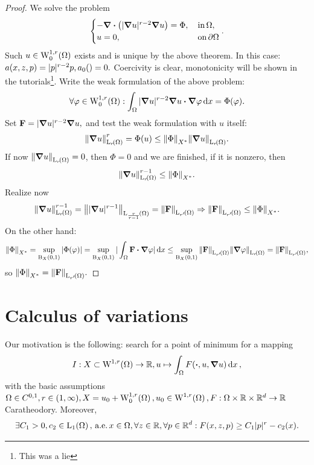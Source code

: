 \documentclass{article}
\begin{document}
\begin{proof}
	We solve the problem
	\begin{equation}
		\begin{cases}
			- \divergence{\qty(|\grad u|^{r-2}\grad u)} = \Phi, & \, \text{in} \, \Omega, \\
			u = 0, & \, \text{on} \, \partial \Omega
		\end{cases}.
	\end{equation}
	Such $u \in \WkpzeroSet[1][r]{\Omega}$ exists and is unique by the above theorem. In this case: $a\qty(x,z,p) = |p|^{r-2} p, a_0() = 0.$ Coercivity is clear, monotonicity will be shown in the tutorials\footnote{This was a lie}. Write the weak formulation of the above problem:
	\[
		\forall \varphi \in \WkpzeroSet[1][r]{\Omega}: \int_{\Omega}|\grad u|^{r-2} \grad u \vdot \grad \varphi \dd{x} = \Phi\qty(\varphi).
	\]
	Set $\vb{F} = |\grad u|^{r-2} \grad u,$ and test the weak formulation with $u$ itself:
	\[
		\norm{\grad u}_{\LpSet[r]{\Omega}}^r = \Phi(u) \leq \norm{\Phi}_{X^{*}} \norm{\grad u}_{\LpSet[r]{\Omega}}.
	\]
	If now $\norm{\grad u}_{\LpSet[r]{\Omega}} = 0$, then $\Phi = 0$ and we are finished, if it is nonzero, then
	\[
		\norm{\grad u}_{\LpSet[r]{\Omega}}^{r-1} \leq \norm{\Phi}_{X^{*}}.
	\]
	Realize now
	\[
		\norm{\grad u}_{\LpSet[r]{\Omega}}^{r-1} = \norm{| \grad u|^{r-1}}_{\LpSet[\frac{r}{r-1}]{\Omega}} = \norm{\vb{F}}_{\LpSet[r']{\Omega}} \Rightarrow \norm{\vb{F}}_{\LpSet[r']{\Omega}} \leq \norm{\Phi}_{X^{*}}.
	\]
	On the other hand:
	\[
		\norm{\Phi}_{X^{*}} = \sup_{\text{B}_{X}(0,1)} |\Phi(\varphi)| = \sup_{\text{B}_{X}(0,1)} |\int_{\Omega}\vb{F} \vdot \grad \varphi|\dd{x} \leq \sup_{\text{B}_{X}(0,1)} \norm{\vb{F}}_{\LpSet[r']{\Omega}} \norm{\grad \varphi}_{\LpSet[r]{\Omega}} = \norm{\vb{F}}_{\LpSet[r']{\Omega}},
	\]
	so $\norm{\Phi}_{X^{*}} = \norm{\vb{F}}_{\LpSet[r']{\Omega}}.$
\end{proof}

\section{Calculus of variations}
\label{sec:calculus_of_variations}

Our motivation is the following: search for a point of minimum for a mapping
\[
	I: X \subset \WkpSet[1][r]{\Omega} \to \R, u \mapsto \int_{\Omega}F\qty(\vdot, u, \grad u)\dd{x},
\]
with the basic assumptions $\Omega \in C^{0,1}, r \in \qty(1, \infty), X = u_0 + \WkpzeroSet[1][r]{\Omega}, u_0 \in \WkpSet[1][r]{\Omega}, F: \Omega \times \R \times \R^d \to \R$ Caratheodory. Moreover,
\[
	\exists C_1 > 0, c_2 \in \LpSet[1]{\Omega}, \, \text{a.e.} \, x \in \Omega, \forall z \in \R, \forall p \in \R^d : F\qty(x,z,p)\geq C_1|p|^r - c_2(x).
\]
\end{document}
